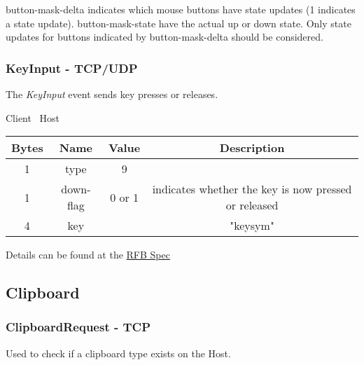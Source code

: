 button-mask-delta indicates which mouse buttons have state updates (1 indicates a state update). button-mask-state have the actual up or down state. Only state updates for buttons indicated by button-mask-delta should be considered.

\subsubsection{KeyInput - TCP/UDP}

The \emph{KeyInput} event sends key presses or releases.

\begin{center}
    Client \textrightarrow\ Host\\
    \begin{tabular}{|c|c|c|c|}
        \hline
        \textbf{Bytes} & \textbf{Name} & \textbf{Value} & \textbf{Description}                                 \\
        \hline
        1              & type          & 9              &                                                      \\
        \hline
        1              & down-flag     & 0 or 1         & indicates whether the key is now pressed or released \\
        \hline
        4              & key           &                & "keysym"                                             \\
        \hline
    \end{tabular}
\end{center}

Details can be found at the \href{https://github.com/rfbproto/rfbproto/blob/master/rfbproto.rst#keyevent}{RFB Spec}

\subsection{Clipboard}

\subsubsection{ClipboardRequest - TCP}

Used to check if a clipboard type exists on the Host.

